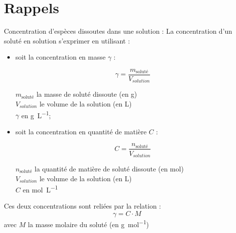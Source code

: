 \documentclass[a4paper,11pt,fleqn]{scrartcl}%
\begin{document}
	\maketitle
	\section{Rappels}
	Concentration d'espèces dissoutes dans une solution :
	La concentration d'un soluté en solution s'exprimer en utilisant :
	\begin{itemize}
		\item soit la concentration en masse $\gamma$ :\\
		\begin{minipage}
			{.4\linewidth}
			$$\gamma = \dfrac{m_{\text{soluté}}}{V_{solution}} $$
		\end{minipage}
		\begin{minipage}
			{.5\linewidth}
			$m_{\text{soluté}}$ la masse de soluté dissoute (en \unit{\gram})\\
			$V_{solution}$ le volume de la solution (en \unit{\liter})\\
			$\gamma$ en \unit{\gram\per\liter};
		\end{minipage}
		\item soit la concentration en quantité de matière $C$ :\\
		\begin{minipage}
			{.4\linewidth}
			$$C = \dfrac{n_{\text{soluté}}}{V_{solution}} $$
		\end{minipage}\begin{minipage}
			{.5\linewidth}
			$n_{\text{soluté}}$ la quantité de matière de soluté dissoute (en \unit{\mole})\\
			$V_{solution}$ le volume de la solution (en \unit{\liter})\\
			$C$ en \unit{\mole\per\liter}
		\end{minipage}
	\end{itemize}
	Ces deux concentrations sont reliées par la relation : $$\gamma =C\cdot M$$ avec $M$ la masse molaire du soluté (en \unit{\gram\per\mole})
\end{document}
